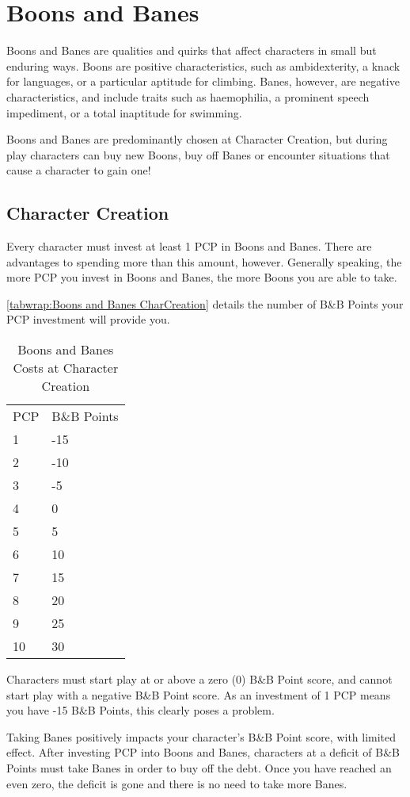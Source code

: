 \documentclass[oneside,11pt,english]{book}
\begin{document}
\chapter{Boons and Banes}\label{ch:boons}
\clearpage
Boons and Banes are qualities and quirks that affect characters in small but enduring ways. Boons are 
positive characteristics, such as ambidexterity, a knack for languages, or a particular aptitude for 
climbing. Banes, however, are negative characteristics, and include traits such as haemophilia, a prominent speech impediment, or a total inaptitude for swimming. 


Boons and Banes are predominantly chosen at Character Creation, but during play characters can buy new 
Boons, buy off Banes or encounter situations that cause a character to gain one! 
\section{Character Creation}
Every character must invest at least 1 PCP in Boons and Banes. There are advantages to spending more 
than this amount, however. Generally speaking, the more PCP you invest in Boons and Banes, the more 
Boons you are able to take. 


\autoref{tabwrap:Boons and Banes CharCreation} details the number of B\&B Points your PCP investment will provide you. 


\begin{wraptable}{r}{5cm}
	\caption{Boons and Banes Costs at Character Creation}
	\label{tabwrap:Boons and Banes CharCreation}
	\begin{tabu}{X[c]X[c]}
		PCP&B\&B Points\\
		1&-15\\
		2&-10\\
		3&-5\\
		4&0\\
		5&5\\
		6&10\\
		7&15\\
		8&20\\
		9&25\\
		10&30\\
	\end{tabu}
\end{wraptable}
Characters must start play at or above a zero (0) B\&B Point score, and cannot start play with a negative 
B\&B Point score. As an investment of 1 PCP means you have -15 B\&B Points, this clearly poses a 
problem. 


Taking Banes positively impacts your character's B\&B Point score, with limited effect. After investing 
PCP into Boons and Banes, characters at a deficit of B\&B Points must take Banes in order to buy off the 
debt. Once you have reached an even zero, the deficit is gone and there is no need to take more Banes. 
\end{document}
